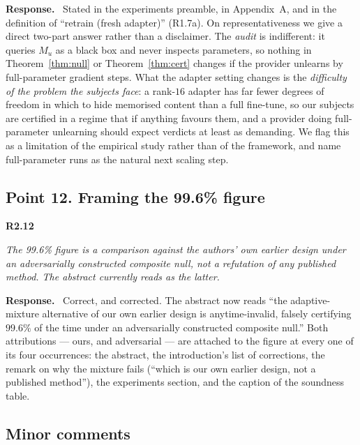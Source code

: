 \documentclass[11pt,a4paper]{article}
\newenvironment{point}[1]{%
  \par\medskip\noindent\textbf{\color{rcol}#1}\par\nopagebreak\smallskip\begingroup
  \color{rcol}\itshape}{\endgroup\par}
\newenvironment{reply}{%
  \par\smallskip\noindent\textbf{\color{acol}Response.}\ \begingroup}{\endgroup\par}
\begin{document}
\begin{reply}
Stated in the experiments preamble, in Appendix~A, and in the definition of ``retrain
(fresh adapter)'' (R1.7a). On representativeness we give a direct two-part answer
rather than a disclaimer. The \emph{audit} is indifferent: it queries $M_u$ as a black
box and never inspects parameters, so nothing in Theorem~\ref{thm:null} or Theorem~\ref{thm:cert} changes if the
provider unlearns by full-parameter gradient steps. What the adapter setting changes is
the \emph{difficulty of the problem the subjects face}: a rank-$16$ adapter has far
fewer degrees of freedom in which to hide memorised content than a full fine-tune, so
our subjects are certified in a regime that if anything favours them, and a provider
doing full-parameter unlearning should expect verdicts at least as demanding. We flag
this as a limitation of the empirical study rather than of the framework, and name
full-parameter runs as the natural next scaling step.
\end{reply}

\subsection*{Point 12. Framing the 99.6\% figure}

\begin{point}{R2.12}
The 99.6\% figure is a comparison against the authors' own earlier design under an
adversarially constructed composite null, not a refutation of any published method. The
abstract currently reads as the latter.
\end{point}

\begin{reply}
Correct, and corrected. The abstract now reads ``the adaptive-mixture alternative of
our own earlier design is anytime-invalid, falsely certifying $99.6\%$ of the time
under an adversarially constructed composite null.'' Both attributions --- ours, and
adversarial --- are attached to the figure at every one of its four occurrences: the
abstract, the introduction's list of corrections, the remark on why the mixture fails
(``which is our own earlier design, not a published method''), the experiments
section, and the caption of the soundness table.
\end{reply}

\subsection*{Minor comments}
\end{document}
